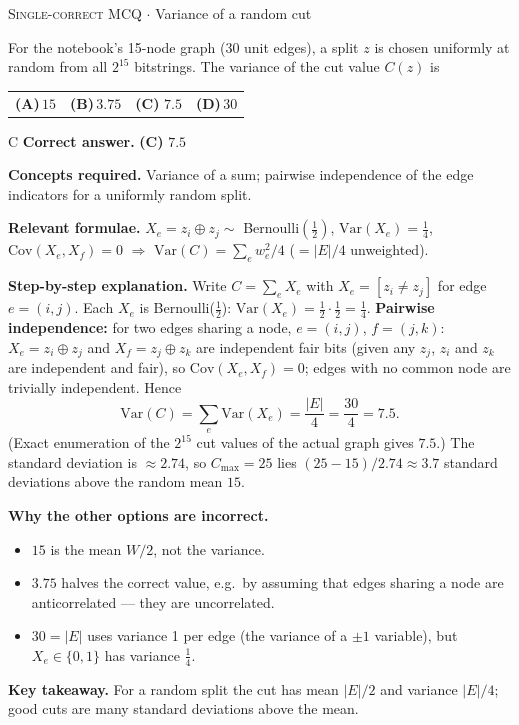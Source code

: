 \documentclass[11pt,a4paper]{article}
\newcommand{\optlabel}[1]{\textbf{(#1)}}
\newcommand{\correctlabel}[1]{\textcolor{okgreen}{\textbf{(#1)}\,\ding{51}}}
\newenvironment{qitem}[1]{\begin{list}{}{\setlength{\leftmargin}{3.3em}\setlength{\labelwidth}{3.1em}%
  \setlength{\labelsep}{0.2em}\setlength{\topsep}{3pt}\setlength{\parsep}{3pt}}\item[\textbf{Q.#1}\hfill]}{\end{list}}
\newcommand{\qsep}{\par\vspace{2pt}{\color{black!15}\hrule}\vspace{4pt}}
\newcommand{\qmeta}[2]{{\footnotesize\color{black!60}\textsc{#1} \;$\cdot$\; #2}\par}
\begin{document}
\begin{qitem}{10}
\qmeta{Single-correct MCQ}{Variance of a random cut}
For the notebook's 15-node graph ($30$ unit edges), a split $z$ is chosen uniformly at random from all $2^{15}$
bitstrings. The variance of the cut value $C(z)$ is
\par\smallskip\noindent\begin{tabularx}{\linewidth}{@{}*{4}{L}@{}}
\optlabel{A}\,$15$ & \optlabel{B}\,$3.75$ & \correctlabel{C}\,$7.5$ & \optlabel{D}\,$30$
\end{tabularx}
\end{qitem}
\begin{solbox}{C}
\textbf{\color{brand}Correct answer.} \textcolor{okgreen}{\textbf{(C)}} $7.5$

\textbf{\color{brand}Concepts required.} Variance of a sum; pairwise independence of the edge indicators for a uniformly random split.

\textbf{\color{brand}Relevant formulae.} $X_e = z_i\oplus z_j \sim$ Bernoulli$(\tfrac12)$, $\mathrm{Var}(X_e) = \tfrac14$, $\mathrm{Cov}(X_e, X_f) = 0$ $\Rightarrow$ $\mathrm{Var}(C) = \sum_e w_e^2/4$ ($= |E|/4$ unweighted).

\textbf{\color{brand}Step-by-step explanation.} Write $C = \sum_{e} X_e$ with $X_e = [z_i \neq z_j]$ for edge $e = (i,j)$. Each $X_e$ is Bernoulli($\tfrac12$):
$\mathrm{Var}(X_e) = \tfrac12\cdot\tfrac12 = \tfrac14$.
\textbf{Pairwise independence:} for two edges sharing a node, $e = (i,j)$, $f = (j,k)$: $X_e = z_i \oplus z_j$ and
$X_f = z_j \oplus z_k$ are independent fair bits (given any $z_j$, $z_i$ and $z_k$ are independent and fair), so
$\mathrm{Cov}(X_e, X_f) = 0$; edges with no common node are trivially independent. Hence
\[ \mathrm{Var}(C) = \sum_e \mathrm{Var}(X_e) = \frac{|E|}{4} = \frac{30}{4} = 7.5 . \]
(Exact enumeration of the $2^{15}$ cut values of the actual graph gives $7.5$.) The standard deviation is $\approx 2.74$, so
$C_{\max} = 25$ lies $(25 - 15)/2.74 \approx 3.7$ standard deviations above the random mean $15$.

\textbf{\color{brand}Why the other options are incorrect.}
\begin{itemize}[leftmargin=2.4em, itemsep=1pt, topsep=2pt]
\item[\textbf{(A)}] $15$ is the mean $W/2$, not the variance.
\item[\textbf{(B)}] $3.75$ halves the correct value, e.g.\ by assuming that edges sharing a node are anticorrelated --- they are uncorrelated.
\item[\textbf{(D)}] $30 = |E|$ uses variance 1 per edge (the variance of a $\pm1$ variable), but $X_e \in \{0,1\}$ has variance $\frac14$.
\end{itemize}
\textbf{\color{brand}Key takeaway.} For a random split the cut has mean $|E|/2$ and variance $|E|/4$; good cuts are many standard deviations above the mean.
\end{solbox}
\qsep
\end{document}
